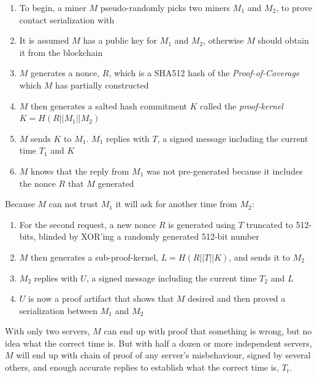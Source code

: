 \documentclass[10pt, nonatbib, nocopyrightspace, reprint]{sigplanconf}
\begin{document}
\begin{enumerate}
        \item To begin, a miner $M$ pseudo-randomly picks two miners $M_1$ and $M_2$, to prove contact serialization with
        \item It is assumed $M$ has a public key for $M_1$ and $M_2$, otherwise $M$ should obtain it from the blockchain
        \item $M$ generates a nonce, $R$, which is a SHA512 hash of the \emph{Proof-of-Coverage} which $M$ has partially constructed
        \item $M$ then generates a salted hash commitment $K$ called the \emph{proof-kernel} ${K = H\left(R || M_1 || M_2\right)}$
        \item $M$ sends $K$ to $M_1$. $M_1$ replies with $T$, a signed message including the current time $T_1$ and $K$
        \item $M$ knows that the reply from $M_1$ was not pre-generated because it includes the nonce $R$ that $M$ generated
\end{enumerate}

Because $M$ can not trust $M_1$ it will ask for another time from $M_2$:

\begin{enumerate}
        \item For the second request, a new nonce $R$ is generated using $T$ truncated to 512-bits, blinded by XOR'ing a randomly generated 512-bit number
        \item $M$ then generates a sub-proof-kernel, $L = H\left(R || T || K\right)$, and sends it to $M_2$
        \item $M_2$ replies with $U$, a signed message including the current time $T_2$ and $L$
        \item $U$ is now a proof artifact that shows that $M$ desired and then proved a serialization between $M_1$ and $M_2$
\end{enumerate}

With only two servers, $M$ can end up with proof that something is wrong, but no idea what the correct time is. But with half a dozen or more independent servers, $M$ will end up with chain of proof of any server's misbehaviour, signed by several others, and enough accurate replies to establish what the correct time is, $T_t$.
\end{document}
